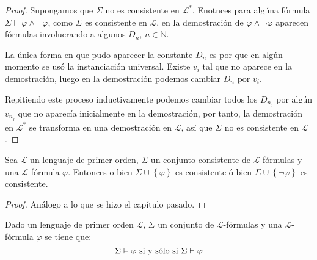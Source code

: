 \documentclass[12pt]{report}
\newcounter{it}
\theoremstyle{largebreak}
\begin{document}
    \begin{proof}
        Supongamos que $\Sigma$ no es consistente en $\mathcal{L}^*$. Enotnces para algúna fórmula $\Sigma\vdash\varphi\land\neg\varphi$, como $\Sigma$ es consistente en $\mathcal{L}$, en la demostración de $\varphi\land\neg\varphi$ aparecen fórmulas involucrando a algunos $D_n$, $n\in\mathbb{N}$.
        
        La única forma en que pudo aparecer la constante $D_n$ es por que en algún momento se usó la instanciación universal. Existe $v_i$ tal que no aparece en la demostración, luego en la demostración podemos cambiar $D_n$ por $v_i$.

        Repitiendo este proceso inductivamente podemos cambiar todos los $D_{ n_j}$ por algún $v_{ n_j}$ que no aparecía inicialmente en la demostración, por tanto, la demostración en $\mathcal{L}^*$ se transforma en una demostración en $\mathcal{L}$, así que $\Sigma$ no es consistente en $\mathcal{L}$.
    \end{proof}

    \begin{lema}
        Sea $\mathcal{L}$ un lenguaje de primer orden, $\Sigma$ un conjunto consistente de $\mathcal{L}$-fórmulas y una $\mathcal{L}$-fórmula $\varphi$. Entonces o bien $\Sigma\cup\left\{\varphi\right\}$ es consistente ó bien $\Sigma\cup\left\{\neg\varphi \right\}$ es consistente. 
    \end{lema}

    \begin{proof}
        Análogo a lo que se hizo el capítulo pasado.
    \end{proof}

    \begin{theor}
        Dado un lenguaje de primer orden $\mathcal{L}$, $\Sigma$ un conjunto de $\mathcal{L}$-fórmulas y una $\mathcal{L}$-fórmula $\varphi$ se tiene que:
        \begin{equation*}
            \Sigma\vDash\varphi\textup{ si y sólo si }\Sigma\vdash\varphi
        \end{equation*}
    \end{theor}
\end{document}
